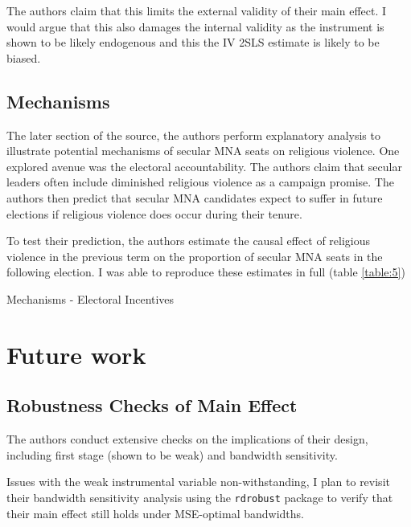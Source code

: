 \documentclass{scrartcl}
\begin{document}
The authors claim that this limits the external validity of their main effect. I would argue that this also damages the internal validity as the instrument is shown to be likely endogenous and this the IV 2SLS estimate is likely to be biased. 


\subsection{Mechanisms}

The later section of the source, the authors perform explanatory analysis to illustrate potential mechanisms of secular MNA seats on religious violence. One explored avenue was the electoral accountability. The authors claim that secular leaders often include diminished religious violence as a campaign promise. The authors then predict that secular MNA candidates expect to suffer in future elections if religious violence does occur during their tenure. 

To test their prediction, the authors estimate the causal effect of religious violence in the previous term on the proportion of secular MNA seats in the following election.
I was able to reproduce these estimates in full (table \ref{table:5})

\begin{table}[ht]
  \begin{center}
    \scalebox{0.75}{
      
    }
    \caption{Mechanisms - Electoral Incentives}
    \label{table:5}
  \end{center}
\end{table}


\section{Future work}

\subsection{Robustness Checks of Main Effect}

The authors conduct extensive checks on the implications of their design, including first stage (shown to be weak) and bandwidth sensitivity. 

Issues with the weak instrumental variable non-withstanding, I plan to revisit their bandwidth sensitivity analysis using the \texttt{rdrobust} package to verify that their main effect still holds under MSE-optimal bandwidths.
\end{document}
